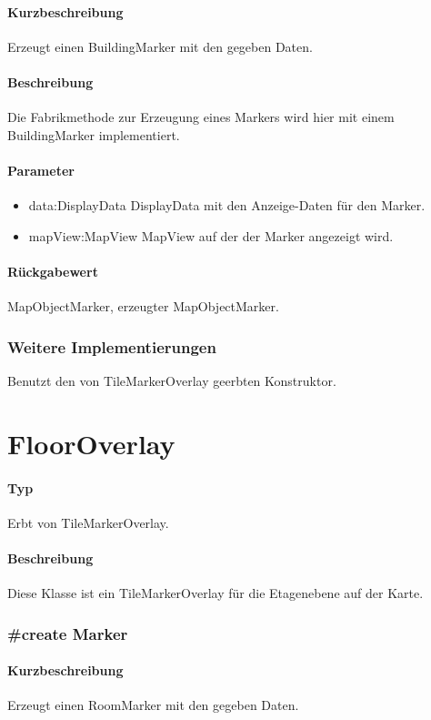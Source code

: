 \paragraph*{Kurzbeschreibung}
Erzeugt einen BuildingMarker mit den gegeben Daten.
\paragraph*{Beschreibung}
Die Fabrikmethode zur Erzeugung eines Markers wird hier mit einem BuildingMarker implementiert.
\paragraph*{Parameter}
\begin{itemize}
    \item data:DisplayData DisplayData mit den Anzeige-Daten für den Marker.
    \item mapView:MapView MapView auf der der Marker angezeigt wird.
\end{itemize}
\paragraph*{Rückgabewert}
MapObjectMarker, erzeugter MapObjectMarker.

\subsubsection{Weitere Implementierungen}%
Benutzt den von TileMarkerOverlay geerbten Konstruktor.

\section{FloorOverlay}
\paragraph*{Typ}
Erbt von TileMarkerOverlay.
\paragraph*{Beschreibung}
Diese Klasse ist ein TileMarkerOverlay für die Etagenebene auf der Karte.

\subsubsection{#create Marker}%
\paragraph*{Kurzbeschreibung}
Erzeugt einen RoomMarker mit den gegeben Daten.
